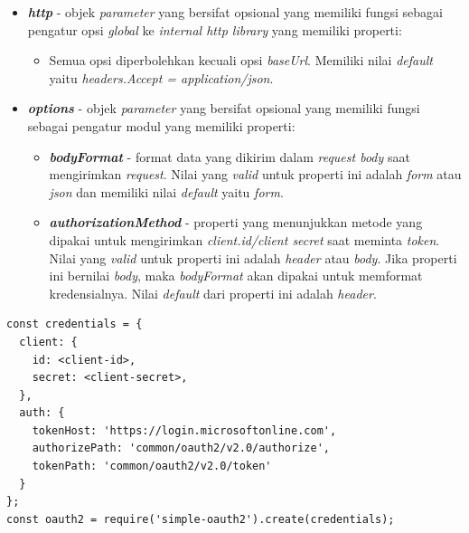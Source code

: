 \begin{itemize}
\begin{itemize}
    \end{itemize}
    \item \textbf{\textit{http}} - objek \textit{parameter} yang bersifat opsional yang memiliki fungsi sebagai pengatur opsi \textit{global} ke \textit{internal http library} yang memiliki properti: 
    \begin{itemize}
        \item Semua opsi diperbolehkan kecuali opsi \textit{baseUrl}. Memiliki nilai \textit{default} yaitu \textit{headers.Accept = application/json}. 
    \end{itemize}
    \item \textbf{\textit{options}} - objek \textit{parameter} yang bersifat opsional yang memiliki fungsi sebagai pengatur modul yang memiliki properti: 
    \begin{itemize}
        \item \textbf{\textit{bodyFormat}} - format data yang dikirim dalam \textit{request body} saat mengirimkan \textit{request}. Nilai yang \textit{valid} untuk properti ini adalah \textit{form} atau \textit{json} dan memiliki nilai \textit{default} yaitu \textit{form}. 
        \item \textbf{\textit{authorizationMethod}} - properti yang menunjukkan metode yang dipakai untuk mengirimkan \textit{client.id/client secret} saat meminta \textit{token}. Nilai yang \textit{valid} untuk properti ini adalah \textit{header} atau \textit{body}. Jika properti ini bernilai \textit{body}, maka \textit{bodyFormat} akan dipakai untuk memformat kredensialnya. Nilai \textit{default} dari properti ini adalah \textit{header}.  
    \end{itemize}
\end{itemize}

\begin{lstlisting}
const credentials = {
  client: {
    id: <client-id>,
    secret: <client-secret>,
  },
  auth: {
    tokenHost: 'https://login.microsoftonline.com',
    authorizePath: 'common/oauth2/v2.0/authorize',
    tokenPath: 'common/oauth2/v2.0/token'
  }
};
const oauth2 = require('simple-oauth2').create(credentials);
\end{lstlisting}

